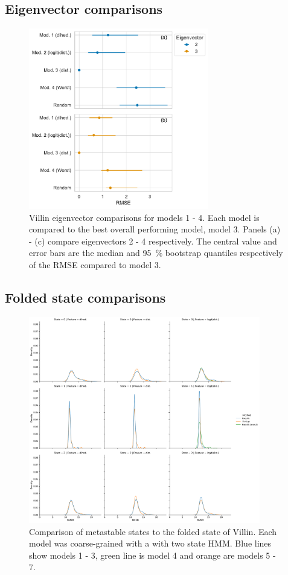 \documentclass{article}
\begin{document}
\subsection{Eigenvector comparisons}

\begin{figure}[h]
    \centering
    \includegraphics[width=0.7\textwidth]{figures/ev_comparisons/2f4k.pdf}
    \caption{Villin eigenvector comparisons for models 1 - 4.  Each model is compared to the best overall performing model, model 3.  Panels (a) - (c) compare eigenvectors 2 - 4 respectively. The central value and error bars are the median and \SI{95}{\percent} bootstrap quantiles respectively of the RMSE compared to model 3. }
    \label{fig:villin_m1_ev_comparisons}
\end{figure}

\clearpage
\subsection{Folded state comparisons}
\begin{figure}[h]
    \centering
    \includegraphics[width=0.9\textwidth]{figures/hmm_folded_state/Villin.pdf}
    \caption{Comparison of metastable states to the folded state of Villin. Each model was coarse-grained with a with two state HMM. Blue lines show models 1 - 3, green line is model 4 and orange are models 5 - 7.}
    \label{fig:villin_m1_ev_comparisons}
\end{figure}
\end{document}
